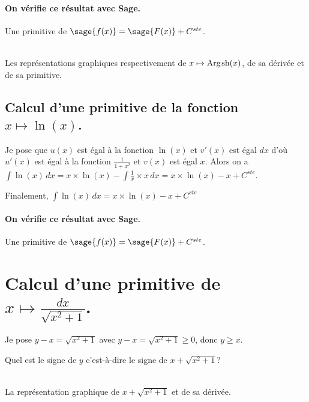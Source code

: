 \documentclass[a4paper,12pt]{report}
\renewcommand{\sinh}{\mathop{\mathrm{sh}}}
\renewcommand{\arg}{\mathop{\mathrm{Arg}}}
\begin{document}
\paragraph{On vérifie ce résultat avec Sage.}
Une primitive de $\sage{f(x)} = \sage{F(x)} + C^{ste} $.

\begin{center}
\\
Les représentations graphiques respectivement de $x \mapsto \arg\mspace{-1mu}\sinh(x)$, de sa dérivée et de sa primitive.
\end{center}












\subsection{Calcul d'une primitive de la fonction  $x \mapsto \ln(x) $.}
Je pose que $u(x)$  est égal à la fonction $\ln(x)$ et $v'(x)$ est égal $dx$  d'où $u'(x)$  est égal à la fonction $ \frac{1}{1+ x^2} $ et $v(x)$ est égal $x$.
Alors on a $\int \ln(x) \, dx = x \times \ln(x) -\int \frac{1}{x} \times x \, dx = x \times \ln(x) - x + C^{ste} $.

Finalement, $\int \ln(x) \, dx = x \times \ln(x) -x + C^{ste} $
\paragraph{On vérifie ce résultat avec Sage.}
Une primitive de $\sage{f(x)} = \sage{F(x)} + C^{ste} $.



\section{Calcul d'une primitive de $ x \longmapsto  \frac{dx}{\sqrt{x^2 + 1} } $. }


Je pose $y-x = \sqrt{x^2+1} $ avec $y - x = \sqrt{x^2 + 1} \geqslant 0 $, donc $y \geqslant  x$.

Quel est le signe de $y$ c'est-à-dire le signe de $x + \sqrt{x^2+1} $?

\begin{center}
 \\
La représentation graphique de $x + \sqrt{x^2+1}$ et de sa dérivée.
\end{center}
\end{document}
